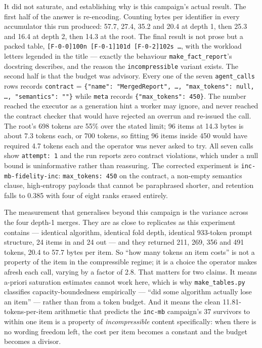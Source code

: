 \documentclass[11pt]{article}
\begin{document}
It did not saturate, and establishing why is this campaign's actual result. The
first half of the answer is re-encoding. Counting bytes per identifier in every accumulator
this run produced: 57.7, 27.4, 35.2 and 20.4 at depth 1, then 25.3 and 16.4 at depth 2,
then 14.3 at the root. The final result is not prose but a packed table,
\texttt{[F-0-0]100n [F-0-1]101d [F-0-2]102s \dots}, with the workload letters legended in
the title --- exactly the behaviour \texttt{make\_fact\_report}'s docstring describes, and
the reason the \texttt{incompressible} variant exists. The second half is that the budget
was advisory. Every one of the seven \texttt{agent\_calls} rows records \texttt{contract} =
\texttt{\{"name": "MergedReport", \dots, "max\_tokens": null, \dots, "semantics": ""\}}
while \texttt{meta} records \texttt{\{"max\_tokens": 450\}}. The number reached the
executor as a generation hint a worker may ignore, and never reached the contract checker
that would have rejected an overrun and re-issued the call. The root's 698 tokens are 55\%
over the stated limit; 96 items at 14.3 bytes is about 7.3 tokens each, or 700 tokens, so
fitting 96 items inside 450 would have required 4.7 tokens each and the operator was never
asked to try. All seven calls show \texttt{attempt: 1} and the run reports zero contract
violations, which under a null bound is uninformative rather than reassuring. The
corrected experiment is \texttt{inc-mb-fidelity-inc}: \texttt{max\_tokens: 450} on the
contract, a non-empty semantics clause, high-entropy payloads that cannot be paraphrased
shorter, and retention falls to 0.385 with four of eight ranks erased entirely.

The measurement that generalises beyond this campaign is the variance across the four
depth-1 merges. They are as close to replicates as this experiment contains --- identical
algorithm, identical fold depth, identical 933-token prompt structure, 24 items in and 24
out --- and they returned 211, 269, 356 and 491 tokens, 20.4 to 57.7 bytes per item. So
``how many tokens an item costs'' is not a property of the item in the compressible regime;
it is a choice the operator makes afresh each call, varying by a factor of 2.8. That
matters for two claims. It means a-priori saturation estimates cannot work here, which is
why \texttt{make\_tables.py} classifies capacity-boundedness empirically --- ``did some
algorithm actually lose an item'' --- rather than from a token budget. And it means the
clean 11.81-tokens-per-item arithmetic that predicts the \texttt{inc-mb} campaign's 37
survivors to within one item is a property of \emph{incompressible} content specifically:
when there is no wording freedom left, the cost per item becomes a constant and the budget
becomes a divisor.
\end{document}
